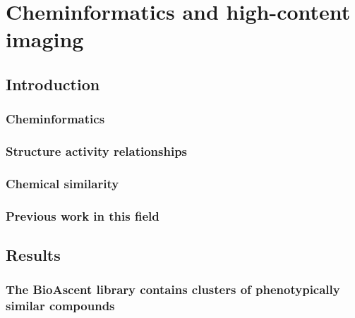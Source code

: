 \documentclass[a4paper,11pt,twoside,openright]{scrbook}
\begin{document}
\chapter{Cheminformatics and high-content imaging} \label{chapter:cheminformatics}

\section{Introduction}


\subsection{Cheminformatics}

\subsection{Structure activity relationships}

\subsection{Chemical similarity}

\subsection{Previous work in this field}

\section{Results}




\subsection{The BioAscent library contains clusters of phenotypically similar compounds}
\end{document}

